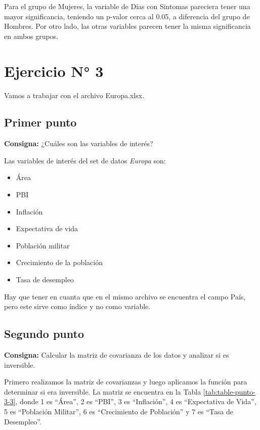 \documentclass{article} %
\begin{document}
Para el grupo de Mujeres, la variable de Días con Sintomas pareciera tener una mayor significancia, teniendo un p-valor cerca al 0.05, a diferencia del grupo de Hombres. Por otro lado, las otras variables parecen tener la misma significancia en ambos grupos. 


\section{Ejercicio N° 3}

Vamos a trabajar con el archivo Europa.xlsx.

\subsection{Primer punto}

\textbf{Consigna:} ¿Cuáles son las variables de interés?

Las variables de interés del set de datos \textit{Europa} son:

\begin{itemize}
\item Área	
\item PBI	
\item Inflación	
\item Expectativa de vida	
\item Población militar	
\item Crecimiento de la población	
\item Tasa de desempleo
\end{itemize}

Hay que tener en cuanta que en el mismo archivo se encuentra el campo País, pero este sirve como índice y no como variable.

\subsection{Segundo punto}

\textbf{Consigna:} Calcular la matriz de covarianza de los datos y analizar si es inversible.

Primero realizamos la matriz de covarianzas y luego aplicamos la función para determinar si era inversible. La matriz se encuentra en la Tabla \ref{tab:table-punto-3-3}, donde 1 es ``Área'', 2 es ``PBI'', 3 es ``Inflación'', 4 es ``Expectativa de Vida'', 5 es ``Población Militar'', 6 es ``Crecimiento de Población'' y 7 es ``Tasa de Desempleo''.
\end{document}
